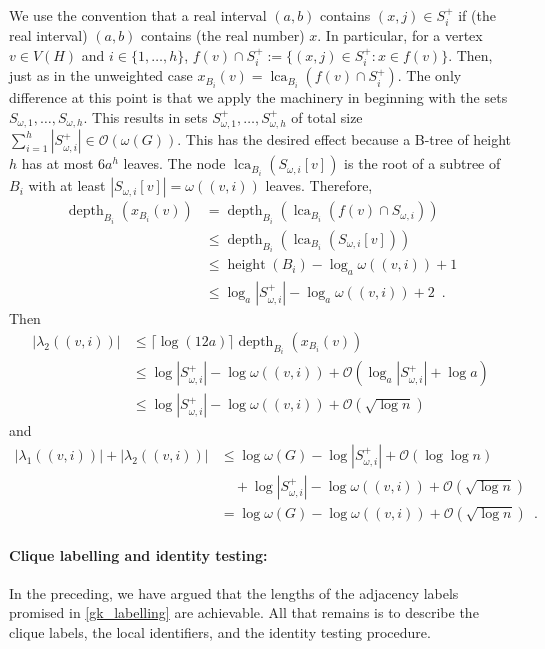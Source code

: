 \documentclass{patmorin}
\renewcommand{\le}{\leqslant}
\DeclareMathOperator{\height}{height}
\DeclareMathOperator{\depth}{depth}
\DeclareMathOperator{\lca}{lca}
\newcommand{\Oh}{\calO}
\newcommand{\calO}{\mathcal{O}}
\begin{document}
  We use the convention that a real interval $(a,b)$ contains $(x,j)\in S^+_i$ if (the real interval) $(a,b)$ contains (the real number) $x$. In particular, for a vertex $v\in V(H)$ and $i\in\{1,\ldots,h\}$, $f(v)\cap S^+_i:=\{(x,j)\in S^+_i:x\in f(v)\}$. Then, just as in the unweighted case $x_{B_i}(v)=\lca_{B_i}(f(v)\cap S^+_i)$.  The only difference at this point is that we apply the machinery in \cite{gawrychowski.janczewski:simpler,dujmovic.esperet.ea:adjacency} beginning with the sets $S_{\omega,1},\ldots,S_{\omega,h}$.
  This results in sets $S^+_{\omega,1},\ldots,S^+_{\omega,h}$ of total size $\sum_{i=1}^h |S^+_{\omega,i}|\in \Oh(\omega(G))$.
  This has the desired effect because a B-tree of height $h$ has at most $6a^h$ leaves.
  The node $\lca_{B_i}(S_{\omega,i}[v])$ is the root of a subtree of $B_i$ with at least $|S_{\omega,i}[v]|=\omega((v,i))$ leaves.
  Therefore,
  \begin{align*}
     \depth_{B_i}(x_{B_i}(v))
     & =
     \depth_{B_i}(\lca_{B_i}(f(v)\cap S_{\omega,i})) \\
     & \le
     \depth_{B_i}(\lca_{B_i}(S_{\omega,i}[v])) \\
     & \le\height(B_i)-\log_a\omega((v,i))+1 \\
     & \le \log_a|S^+_{\omega,i}| - \log_a\omega((v,i)) + 2 \enspace .
  \end{align*}
  Then
  \begin{align*}
     |\lambda_2((v,i))|
     & \le \lceil \log(12a)\rceil \depth_{B_i}(x_{B_i}(v)) \\
     & \le \log |S^+_{\omega,i}|-\log \omega((v,i)) + \Oh(\log_a|S^+_{\omega,i}|+ \log a) \\
     & \le \log |S^+_{\omega,i}|-\log \omega((v,i)) + \Oh(\sqrt{\log n})
  \end{align*}
  and
  \begin{align*}
     |\lambda_1((v,i))|+|\lambda_2((v,i))|
     & \le \log\omega(G) - \log |S^+_{\omega,i}| + \Oh(\log\log n) \\
     & \quad {} + \log |S^+_{\omega,i}|-\log \omega((v,i)) + \Oh(\sqrt{\log n}) \\
     & = \log\omega(G) - \log\omega((v,i)) + \Oh(\sqrt{\log n}) \enspace .
  \end{align*}

  \paragraph{Clique labelling and identity testing:}
  In the preceding, we have argued that the lengths of the adjacency labels promised in \cref{gk_labelling} are achievable.
  All that remains is to describe the clique labels, the local identifiers, and the identity testing procedure.
\end{document}

